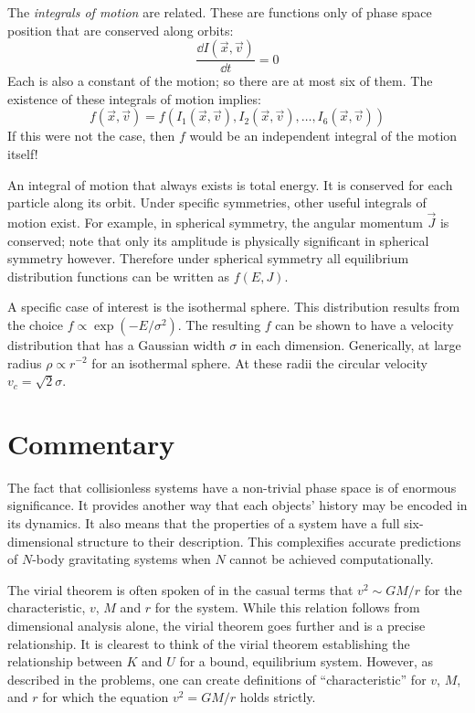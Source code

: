 The {\it integrals of motion} are related. These are functions only of
phase space position that are conserved along orbits:
\begin{equation}
\frac{\dd{I(\vec{x}, \vec{v})}}{\dd{t}} = 0 
\end{equation}
Each is also a constant of the motion; so there are at most six of
them. The existence of these integrals of motion implies:
\begin{equation}
f(\vec{x}, \vec{v}) = f\left(I_1(\vec{x}, \vec{v}),
I_2(\vec{x}, \vec{v}), \ldots, I_6(\vec{x}, \vec{v})\right)
\end{equation}
If this were not the case, then $f$ would be an independent integral
of the motion itself!

An integral of motion that always exists is total energy. It is
conserved for each particle along its orbit. Under specific
symmetries, other useful integrals of motion exist. For example, in
spherical symmetry, the angular momentum $\vec{J}$ is conserved; note
that only its amplitude is physically significant in spherical
symmetry however. Therefore under spherical symmetry all equilibrium
distribution functions can be written as $f(E, J)$. 

A specific case of interest is the isothermal sphere. This
distribution results from the choice $f\propto \exp(-E/\sigma^2)$. The
resulting $f$ can be shown to have a velocity distribution that has a
Gaussian width $\sigma$ in each dimension. Generically, at large
radius $\rho \propto r^{-2}$ for an isothermal sphere. At these radii
the circular velocity $v_c = \sqrt{2}\sigma$. 

\section{Commentary}

The fact that collisionless systems have a non-trivial phase space is
of enormous significance. It provides another way that each objects'
history may be encoded in its dynamics. It also means that the
properties of a system have a full six-dimensional structure to their
description. This complexifies accurate predictions of $N$-body
gravitating systems when $N$ cannot be achieved computationally.

The virial theorem is often spoken of in the casual terms that
$v^2 \sim GM/r$ for the characteristic, $v$, $M$ and $r$ for the
system. While this relation follows from dimensional analysis alone,
the virial theorem goes further and is a precise relationship. It is
clearest to think of the virial theorem establishing the relationship
between $K$ and $U$ for a bound, equilibrium system.  However, as
described in the problems, one can create definitions of
``characteristic'' for $v$, $M$, and $r$ for which the equation $v^2 =
GM/r$ holds strictly.


